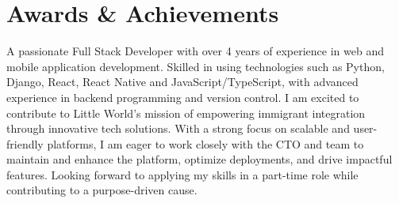 
\section{Awards \& Achievements}
\vspace{2pt}
A passionate Full Stack Developer with over 4 years of experience in web and mobile application development. Skilled in using technologies such as Python, Django, React, React Native and JavaScript/TypeScript, with advanced experience in backend programming and version control. I am excited to contribute to Little World’s mission of empowering immigrant integration through innovative tech solutions. With a strong focus on scalable and user-friendly platforms, I am eager to work closely with the CTO and team to maintain and enhance the platform, optimize deployments, and drive impactful features. Looking forward to applying my skills in a part-time role while contributing to a purpose-driven cause.






